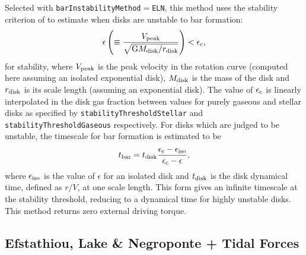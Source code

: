 Selected with {\tt barInstabilityMethod}$=${\tt ELN}, this method uses the stability criterion of \cite{efstathiou_stability_1982} to estimate when disks are unstable to bar formation:
\begin{equation}
 \epsilon \left( \equiv {V_{\rm peak} \over \sqrt{\G M_{\rm disk}/r_{\rm disk}}} \right) < \epsilon_{\rm c},
\end{equation}
for stability, where $V_{\rm peak}$ is the peak velocity in the rotation curve (computed here assuming an isolated exponential disk), $M_{\rm disk}$ is the mass of the disk and $r_{\rm disk}$ is its scale length (assuming an exponential disk). The value of $\epsilon_{\rm c}$ is linearly interpolated in the disk gas fraction between values for purely gaseous and stellar disks as specified by {\tt stabilityThresholdStellar} and {\tt stabilityThresholdGaseous} respectively. For disks which are judged to be unstable, the timescale for bar formation is estimated to be
\begin{equation}
 t_{\rm bar} = t_{\rm disk} {\epsilon_{\rm c} - \epsilon_{\rm iso} \over \epsilon_{\rm c} - \epsilon},
\end{equation}
where $\epsilon_{\rm iso}$ is the value of $\epsilon$ for an isolated disk and $t_{\rm disk}$ is the disk dynamical time, defined as $r/V$, at one scale length. This form gives an infinite timescale at the stability threshold, reducing to a dynamical time for highly unstable disks. This method returns zero external driving torque.

\subsection{Efstathiou, Lake \& Negroponte + Tidal Forces}

